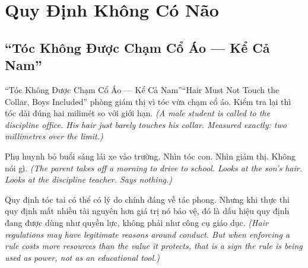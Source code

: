 
\chapter{Quy Định Không Có Não}

\section{``Tóc Không Được Chạm Cổ Áo --- Kể Cả Nam''}
\begin{truyen}{``Tóc Không Được Chạm Cổ Áo --- Kể Cả Nam''}{``Hair Must Not Touch the Collar, Boys Included''}
 phòng giám thị vì tóc vừa chạm cổ áo. Kiểm tra lại thì tóc dài đúng hai milimét so với giới hạn.
\textit{(A male student is called to the discipline office. His hair just barely touches his collar. Measured exactly: two millimetres over the limit.)}



Phụ huynh bỏ buổi sáng lái xe vào trường. Nhìn tóc con. Nhìn giám thị. Không nói gì.
\textit{(The parent takes off a morning to drive to school. Looks at the son's hair. Looks at the discipline teacher. Says nothing.)}

\begin{baihoc}
Quy định tóc tai có thể có lý do chính đáng về tác phong. Nhưng khi thực thi quy định mất nhiều tài nguyên hơn giá trị nó bảo vệ, đó là dấu hiệu quy định đang được dùng như quyền lực, không phải như công cụ giáo dục.
\textit{(Hair regulations may have legitimate reasons around conduct. But when enforcing a rule costs more resources than the value it protects, that is a sign the rule is being used as power, not as an educational tool.)}
\end{baihoc}
\end{truyen}

